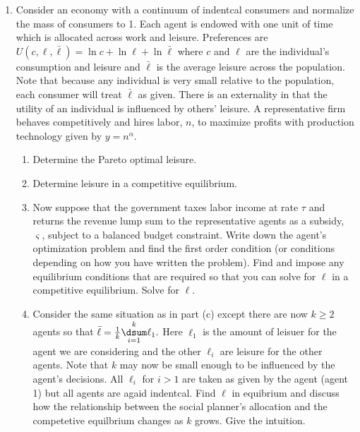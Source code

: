 \documentclass{article}
\begin{document}
\begin{enumerate}
\item Consider an economy with a continuum of indentcal consumers and
normalize the mass of consumers to 1. Each agent is endowed with one unit of
time which is allocated across work and leisure. Preferences are $U\left(
c,\ell ,\bar{\ell}\right) =\ln c+\ln \ell +\ln \bar{\ell}$ where $c$ and $%
\ell $ are the individual's consumption and leisure and $\bar{\ell}$ is the
average leisure across the population. Note that because any individual is
very small relative to the population, each consumer will treat $\bar{\ell}$
as given. There is an externality in that the utility of an individual is
influenced by others' leisure. A representative firm behaves competitively
and hires labor, $n$, to maximize profits with production technology given
by $y=n^{\alpha }$.

\begin{enumerate}
\item Determine the Pareto optimal leisure.

\item Determine leisure in a competitive equilibrium.

\item Now suppose that the government taxes labor income at rate $\tau $ and
returns the revenue lump sum to the representative agents as a subsidy, $%
\varsigma $, subject to a balanced budget constraint. Write down the agent's
optimization problem and find the first order condition (or conditions
depending on how you have written the problem). Find and impose any
equilibrium conditions that are required so that you can solve for $\ell $
in a competitive equilibrium. Solve for $\ell .$

\item Consider the same situation as in part (c) except there are now $k\geq
2$ agents so that $\bar{\ell}=\frac{1}{k}\underset{i=1}{\overset{k}{\dsum }}%
\ell _{1}.$  Here $\ell _{1}$ is the amount of leisuer for the agent we are
considering and  the other $\ell _{i}$ are  leisure for the other agents.
Note that $k$ may now be small enough to be influenced by the agent's
decisions. All $\ell _{i}$ for $i>1$ are taken as given by the agent (agent
1) but all agents are agaid indentcal. Find $\ell $ in equibrium and discuss
how the relationship between the social planner's allocation and the
competetive equilbrium changes as  $k$ grows. Give the intuition. 
\end{enumerate}


\end{enumerate}
\end{document}
